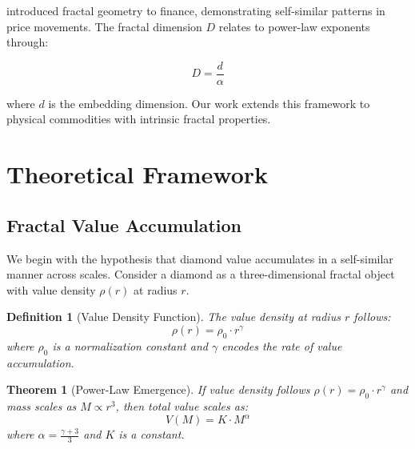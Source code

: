 \documentclass[12pt,a4paper]{article}
\newtheorem{theorem}{Theorem}
\newtheorem{definition}{Definition}
\begin{document}
\citet{mandelbrot1982} introduced fractal geometry to finance, demonstrating self-similar patterns in price movements. The fractal dimension $D$ relates to power-law exponents through:

\begin{equation}
D = \frac{d}{\alpha}
\end{equation}

where $d$ is the embedding dimension. Our work extends this framework to physical commodities with intrinsic fractal properties.

\section{Theoretical Framework}
\label{sec:theory}

\subsection{Fractal Value Accumulation}

We begin with the hypothesis that diamond value accumulates in a self-similar manner across scales. Consider a diamond as a three-dimensional fractal object with value density $\rho(r)$ at radius $r$.

\begin{definition}[Value Density Function]
The value density at radius $r$ follows:
\begin{equation}
\rho(r) = \rho_0 \cdot r^{\gamma}
\end{equation}
where $\rho_0$ is a normalization constant and $\gamma$ encodes the rate of value accumulation.
\end{definition}

\begin{theorem}[Power-Law Emergence]
\label{thm:powerlaw}
If value density follows $\rho(r) = \rho_0 \cdot r^{\gamma}$ and mass scales as $M \propto r^3$, then total value scales as:
\begin{equation}
V(M) = K \cdot M^{\alpha}
\end{equation}
where $\alpha = \frac{\gamma + 3}{3}$ and $K$ is a constant.
\end{theorem}
\end{document}
